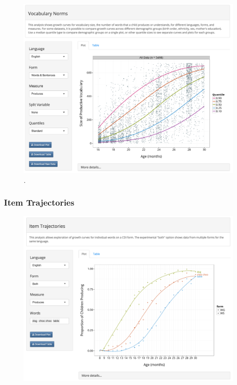 \documentclass[man,noapacite]{apa2}
\begin{document}
\begin{figure}[h!]
\includegraphics[width=6.5in]{figures/normsapp.png}
\caption{\label{fig:norms}.}
\end{figure}


\subsubsection{Item Trajectories}

\begin{figure}[h!]
\includegraphics[width=6.5in]{figures/itemsapp.png}
\caption{\label{fig:items} }
\end{figure}
\end{document}
